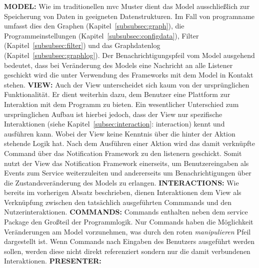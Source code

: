 \textbf{MODEL:}\newline
Wie im traditionellen \gls{mvc} Muster dient das Model ausschließlich zur Speicherung von Daten in geeigneten Datenstrukturen. Im Fall von \gls{programname} umfasst dies den Graphen (Kapitel~\ref{subsubsec:graph}), die Programmeinstellungen (Kapitel~\ref{subsubsec:configdata}), Filter (Kapitel~\ref{subsubsec:filter}) und das Graphdatenlog (Kapitel~\ref{subsubsec:graphlog}). Der Benachrichtigungspfeil vom Model ausgehend bedeutet, dass bei Veränderung des Models eine Nachricht an alle Listener geschickt wird die unter Verwendung des Frameworks mit dem Model in Kontakt stehen.\newline
 \newline
\textbf{VIEW:}\newline
Auch der View unterscheidet sich kaum von der ursprünglichen Funktionalität. Er dient weiterhin dazu, dem Benutzer eine Plattform zur Interaktion mit dem Programm zu bieten. Ein wesentlicher Unterschied zum ursprünglichen Aufbau ist hierbei jedoch, dass der View nur spezifische Interaktionen (siehe Kapitel~\ref{subsec:interaction}: interaction) kennt und ausführen kann. Wobei der View keine Kenntnis über die hinter der Aktion stehende Logik hat. Nach dem Ausführen einer Aktion wird das damit verknüpfte Command über das Notification Framework zu den \gls{listener}n geschickt. Somit nutzt der View das Notification Framework einerseits, um Benutzereingaben als Events zum Service weiterzuleiten und andererseits um Benachrichtigungen über die Zustandsveränderung des Models zu erlangen.\newline
 \newline
\textbf{INTERACTIONS:}\newline
Wie bereits im vorherigen Absatz beschrieben, dienen Interaktionen dem View als Verknüpfung zwischen den tatsächlich ausgeführten Commmands und den Nutzerinteraktionen.\newline
 \newline
\textbf{COMMANDS:}\newline
Commands enthalten neben dem service Package den Großteil der Programmlogik. Nur Commands haben die Möglichkeit Veränderungen am Model vorzunehmen, was durch den roten \textit{manipulieren} Pfeil dargestellt ist. Wenn Commands nach Eingaben des Benutzers ausgeführt werden sollen, werden diese nicht direkt referenziert sondern nur die damit verbundenen Interaktionen.\newline
 \newline
\textbf{PRESENTER:}\newline
